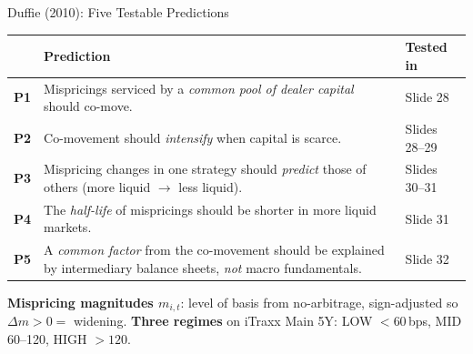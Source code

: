 \documentclass[aspectratio=169,11pt]{beamer}
\newcommand{\hlt}[1]{\textcolor{edhecred}{\textbf{#1}}}     %
\newcommand{\hltb}[1]{\textcolor{accentblue}{\textbf{#1}}}  %
\begin{document}
\begin{frame}[t]{Duffie (2010): Five Testable Predictions}
\small
\vspace{0.10cm}

\renewcommand{\arraystretch}{1.40}
\setlength{\tabcolsep}{6pt}

\begin{tabular}{p{0.7cm}p{8.7cm}p{3.3cm}}
\toprule
 & \textbf{Prediction} & \textbf{Tested in} \\
\midrule
\hlt{P1} & Mispricings serviced by a \emph{common pool of dealer capital} should co-move.
         & Slide 28 \\
\hlt{P2} & Co-movement should \emph{intensify} when capital is scarce.
         & Slides 28--29 \\
\hlt{P3} & Mispricing changes in one strategy should \emph{predict} those of others
           (more liquid $\to$ less liquid).
         & Slides 30--31 \\
\hlt{P4} & The \emph{half-life} of mispricings should be shorter in more liquid markets.
         & Slide 31 \\
\hlt{P5} & A \emph{common factor} from the co-movement should be explained by
           intermediary balance sheets, \emph{not} macro fundamentals.
         & Slide 32 \\
\bottomrule
\end{tabular}

\vspace{0.30cm}

{\footnotesize
\textbf{Mispricing magnitudes $m_{i,t}$}: level of basis from no-arbitrage, sign-adjusted so
$\Delta m > 0 =$ widening. \hltb{Three regimes} on iTraxx Main 5Y: LOW $<60$\,bps,
MID 60--120, HIGH $>120$.}

\end{frame}
\end{document}
